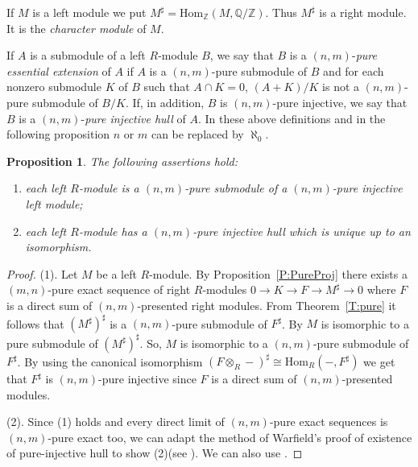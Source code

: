 \documentclass{amsart}
\newtheorem{proposition}[theorem]{Proposition}
\begin{document}
If $M$ is a left module we put $M^{\sharp}=\mathrm{Hom}_{\mathbb{Z}}(M,\mathbb{Q}/\mathbb{Z})$. Thus $M^{\sharp}$ is a right module. It is the {\it character module} of $M$.

If $A$ is a submodule of a left $R$-module $B$, we say that $B$ is a $(n,m)$-{\it pure essential extension} of $A$ if $A$ is a $(n,m)$-pure submodule of $B$ and for each nonzero submodule $K$ of $B$ such that $A\cap K=0$, $(A+K)/K$ is not a $(n,m)$-pure submodule of $B/K$. If, in addition, $B$ is $(n,m)$-pure injective, we say that $B$ is a $(n,m)$-{\it pure injective hull} of $A$. In these above definitions and in the following proposition $n$ or $m$ can be  replaced by $\aleph_0$.

\begin{proposition}
\label{P:PureInj} The following assertions hold:
\begin{enumerate}
\item each left $R$-module is a $(n,m)$-pure submodule of a $(n,m)$-pure injective left module;
\item each left $R$-module has a $(n,m)$-pure injective hull which is unique up to an isomorphism.
\end{enumerate}
\end{proposition}
\begin{proof}
(1). Let $M$ be a left $R$-module. By Proposition~\ref{P:PureProj} there exists a $(m,n)$-pure exact sequence of right $R$-modules $0\rightarrow K\rightarrow F\rightarrow M^{\sharp}\rightarrow 0$ where $F$ is a direct sum of $(n,m)$-presented right modules. From Theorem~\ref{T:pure} it  follows that $(M^{\sharp})^{\sharp}$ is a $(n,m)$-pure submodule of $F^{\sharp}$. By \cite[Corollary 1.30]{Fac98} $M$ is isomorphic to a pure submodule of $(M^{\sharp})^{\sharp}$. So, $M$ is isomorphic to a $(n,m)$-pure submodule of $F^{\sharp}$. By using the canonical isomorphism $(F\otimes_R-)^{\sharp}\cong\mathrm{Hom}_R(-,F^{\sharp})$ we get that $F^{\sharp}$ is $(n,m)$-pure injective since $F$ is a direct sum of $(n,m)$-presented modules.

(2). Since (1) holds and every direct limit of $(n,m)$-pure exact sequences is $(n,m)$-pure exact too, we can adapt the method of Warfield's proof of existence of pure-injective hull to show (2)(see \cite[Proposition 6]{War69}). We can also use \cite[Proposition 4.5]{Ste67}.
\end{proof}
\end{document}
